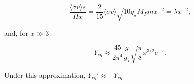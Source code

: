 \documentclass[final,5p,times,twocolumn, nopreprintline]{elsarticle}
\numberwithin{equation}{section}
\begin{document}
\begin{equation}
\dfrac{\langle\sigma v\rangle s}{Hx}=\dfrac{2}{15}\langle\sigma v\rangle\sqrt{10g_\star}M_Pmx^{-2}=\lambda x^{-2}, \label{eq:factor}
\end{equation}

and, for $x\gg3$

\begin{equation}
Y_{eq}\approx\dfrac{45}{2\pi^4}\dfrac{g}{g_\star}\sqrt{\dfrac{\pi}{8}}x^{3/2}e^{-x}. \label{eq:Yeq_lat}
\end{equation}

Under this approximation, $Y_{eq}'\approx-Y_{eq}$
 







\end{document}
